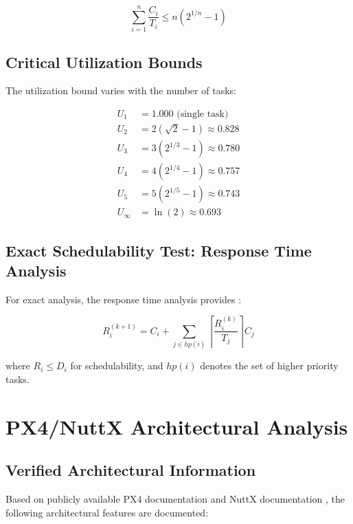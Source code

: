 \documentclass[12pt,a4paper]{article}
\begin{document}
\begin{equation}
\sum_{i=1}^{n} \frac{C_i}{T_i} \leq n(2^{1/n} - 1)
\end{equation}

\subsection{Critical Utilization Bounds}

The utilization bound varies with the number of tasks:

\begin{align}
U_1 &= 1.000 \text{ (single task)} \\
U_2 &= 2(\sqrt{2} - 1) \approx 0.828 \\
U_3 &= 3(2^{1/3} - 1) \approx 0.780 \\
U_4 &= 4(2^{1/4} - 1) \approx 0.757 \\
U_5 &= 5(2^{1/5} - 1) \approx 0.743 \\
U_{\infty} &= \ln(2) \approx 0.693
\end{align}

\subsection{Exact Schedulability Test: Response Time Analysis}

For exact analysis, the response time analysis provides \cite{audsley1993}:

\begin{equation}
R_i^{(k+1)} = C_i + \sum_{j \in hp(i)} \left\lceil \frac{R_i^{(k)}}{T_j} \right\rceil C_j
\end{equation}

where $R_i \leq D_i$ for schedulability, and $hp(i)$ denotes the set of higher priority tasks.

\section{PX4/NuttX Architectural Analysis}

\subsection{Verified Architectural Information}

Based on publicly available PX4 documentation \cite{px4dev} and NuttX documentation \cite{nuttx}, the following architectural features are documented:
\end{document}
